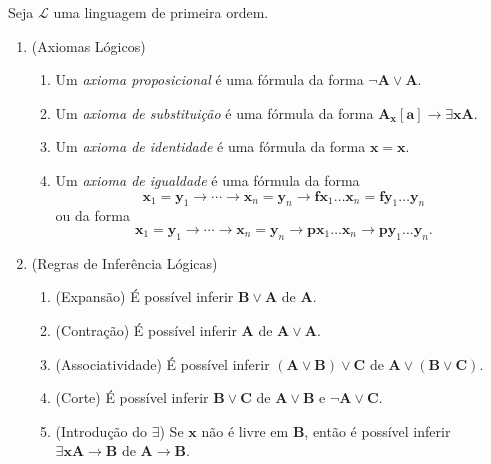 \begin{definition}
    Seja $\mathcal{L}$ uma linguagem de primeira ordem.
        \begin{enumerate}[leftmargin=*, align=left, label=\textbf{(\alph*)}]
            \item (Axiomas Lógicos)
                \begin{enumerate}[label=\roman*.]
                    \item Um \emph{axioma proposicional} é uma fórmula da forma $\neg \mathbf{A} \lor \mathbf{A}$.
                    \item Um \emph{axioma de substituição} é uma fórmula da forma $\mathbf{A}_{\mathbf{x}}[\mathbf{a}] \rightarrow \exists \mathbf{x} \mathbf{A}$.
                    \item Um \emph{axioma de identidade} é uma fórmula da forma $\mathbf{x} = \mathbf{x}$.
                    \item Um \emph{axioma de igualdade} é uma fórmula da forma
                        \[
                            \mathbf{x}_1 = \mathbf{y}_1 \rightarrow \cdots \rightarrow \mathbf{x}_n = \mathbf{y}_n \rightarrow \mathbf{f} \mathbf{x}_1 \ldots \mathbf{x}_n = \mathbf{f} \mathbf{y}_1 \ldots \mathbf{y}_n
                        \]
                    ou da forma
                        \[
                            \mathbf{x}_1 = \mathbf{y}_1 \rightarrow \cdots \rightarrow \mathbf{x}_n = \mathbf{y}_n \rightarrow \mathbf{p} \mathbf{x}_1 \ldots \mathbf{x}_n \rightarrow \mathbf{p} \mathbf{y}_1 \ldots \mathbf{y}_n.
                        \]
                \end{enumerate}
            \item (Regras de Inferência Lógicas)
                \begin{enumerate}[label=\roman*.]
                    \item (Expansão) É possível inferir $\mathbf{B} \lor \mathbf{A}$ de $\mathbf{A}$.
                    \item (Contração) É possível inferir $\mathbf{A}$ de $\mathbf{A} \lor \mathbf{A}$.
                    \item (Associatividade) É possível inferir $(\mathbf{A} \lor \mathbf{B}) \lor \mathbf{C}$ de $\mathbf{A} \lor (\mathbf{B} \lor \mathbf{C})$.
                    \item (Corte) É possível inferir $\mathbf{B} \lor \mathbf{C}$ de $\mathbf{A} \lor \mathbf{B}$ e $\neg \mathbf{A} \lor \mathbf{C}$.
                    \item (Introdução do $\exists$) Se $\mathbf{x}$ não é livre em $\mathbf{B}$, então é possível inferir $\exists \mathbf{x} \mathbf{A} \rightarrow \mathbf{B}$ de $\mathbf{A} \to \mathbf{B}$.
                \end{enumerate}
        \end{enumerate}
\end{definition}

